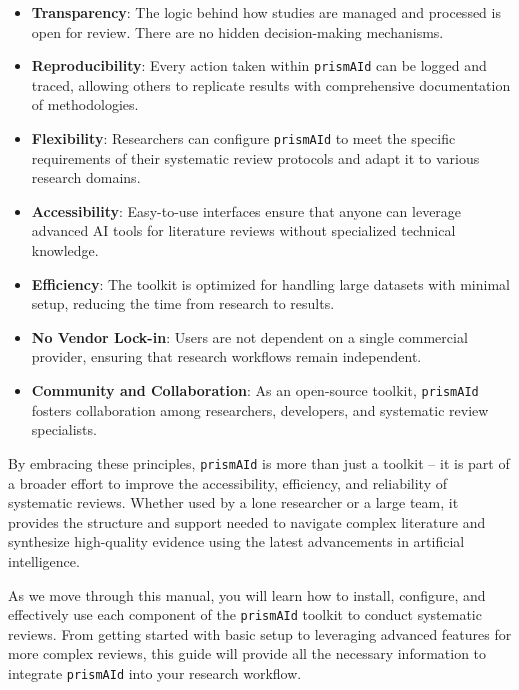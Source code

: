\begin{itemize}
    \item \textbf{Transparency}: The logic behind how studies are managed and processed is open for review. There are no hidden decision-making mechanisms.

    \item \textbf{Reproducibility}: Every action taken within \texttt{prismAId} can be logged and traced, allowing others to replicate results with comprehensive documentation of methodologies.

    \item \textbf{Flexibility}: Researchers can configure \texttt{prismAId} to meet the specific requirements of their systematic review protocols and adapt it to various research domains.

    \item \textbf{Accessibility}: Easy-to-use interfaces ensure that anyone can leverage advanced AI tools for literature reviews without specialized technical knowledge.

    \item \textbf{Efficiency}: The toolkit is optimized for handling large datasets with minimal setup, reducing the time from research to results.

    \item \textbf{No Vendor Lock-in}: Users are not dependent on a single commercial provider, ensuring that research workflows remain independent.

    \item \textbf{Community and Collaboration}: As an open-source toolkit, \texttt{prismAId} fosters collaboration among researchers, developers, and systematic review specialists.
\end{itemize}

By embracing these principles, \texttt{prismAId} is more than just a toolkit -- it is part of a broader effort to improve the accessibility, efficiency, and reliability of systematic reviews. Whether used by a lone researcher or a large team, it provides the structure and support needed to navigate complex literature and synthesize high-quality evidence using the latest advancements in artificial intelligence.

As we move through this manual, you will learn how to install, configure, and effectively use each component of the \texttt{prismAId} toolkit to conduct systematic reviews. From getting started with basic setup to leveraging advanced features for more complex reviews, this guide will provide all the necessary information to integrate \texttt{prismAId} into your research workflow.
